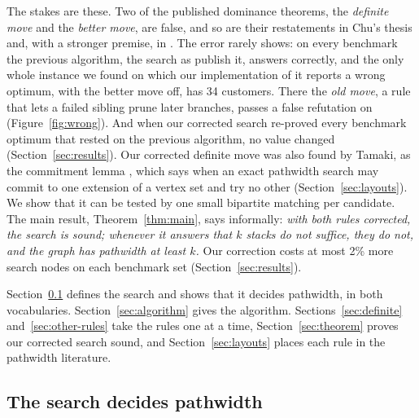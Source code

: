 The stakes are these. Two of the published dominance theorems, the
\emph{definite move} and the \emph{better move}, are false, and so are their
restatements in Chu's thesis \citep{Chu2011} and, with a stronger premise, in
\citet{Fink2012}. The error rarely shows: on every benchmark the previous algorithm, the search
as \citet{ChuStuckey2009} publish it, answers correctly, and the only whole
instance we found on which our implementation of it reports a wrong optimum,
with the better move off, has 34 customers. There the \emph{old move}, a rule
that lets a failed sibling prune later branches, passes a false refutation on
(Figure~\ref{fig:wrong}). And when our corrected search re-proved every
benchmark optimum that rested on the previous algorithm, no value changed (Section~\ref{sec:results}). Our corrected definite
move was also found by Tamaki, as the commitment lemma \citep[Lemma~1]{Kitsunai2016},
which says when an exact pathwidth search may commit to one extension of a
vertex set and try no other (Section~\ref{sec:layouts}). We
show that it can be tested by one small bipartite matching per candidate. The
main result, Theorem~\ref{thm:main}, says informally: \emph{with both rules
corrected, the search is sound; whenever it answers that $k$ stacks do not
suffice, they do not, and the graph has pathwidth at least $k$.} Our correction
costs at most 2\% more search nodes on each benchmark set
(Section~\ref{sec:results}).

Section~\ref{sec:search-def} defines the search and shows that it decides
pathwidth, in both vocabularies. Section~\ref{sec:algorithm} gives the
algorithm. Sections~\ref{sec:definite} and~\ref{sec:other-rules} take the
rules one at a time, Section~\ref{sec:theorem} proves our corrected search
sound, and Section~\ref{sec:layouts} places each rule in the pathwidth
literature.

\subsection{The search decides pathwidth}
\label{sec:search-def}

